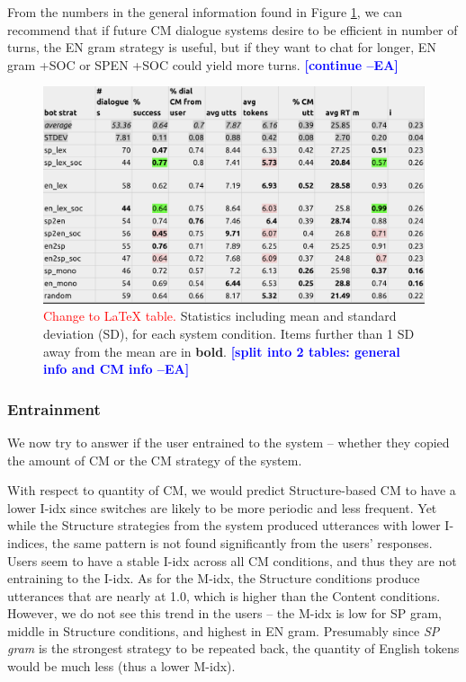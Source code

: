 \documentclass[11pt,a4paper]{article}
\newcommand{\ea}[1]{\textcolor{blue}{\bf\small [#1 --EA]}}
\newcommand{\red}[1]{\textcolor{red}{#1}}
\begin{document}
From the numbers in the general information found in Figure \ref{fig:general_tbl}, we can recommend that if future CM dialogue systems desire to be efficient in number of turns, the EN gram strategy is useful, but if they want to chat for longer, EN gram +SOC or SP\textrightarrow EN +SOC could yield more turns. \ea{continue}

\begin{figure}[t]
    
	\includegraphics[width=\textwidth]{img/0927_tbl_general}
	\centering
  	\caption{\red{Change to LaTeX table.} Statistics including mean and standard deviation (SD), for each system condition. Items further than 1 SD away from the mean are in \textbf{bold}. \ea{split into 2 tables: general info and CM info}}
    \label{fig:general_tbl}
\end{figure}



\subsubsection{Entrainment}

We now try to answer if the user entrained to the system -- whether they copied the amount of CM or the CM strategy of the system.

With respect to quantity of CM, we would predict Structure-based CM to have a lower I-idx since switches are likely to be more periodic and less frequent.
Yet while the Structure strategies from the system produced utterances with lower I-indices, the same pattern is not found significantly from the users' responses. 
Users seem to have a stable I-idx across all CM conditions, and thus they are not entraining to the I-idx. 
As for the M-idx, the Structure conditions produce utterances that are nearly at 1.0, which is higher than the Content conditions. 
However, we do not see this trend in the users -- the M-idx is low for SP gram, middle in Structure conditions, and highest in EN gram.
Presumably since \textit{SP gram} is the strongest strategy to be repeated back, the quantity of English tokens would be much less (thus a lower M-idx). 
\end{document}
